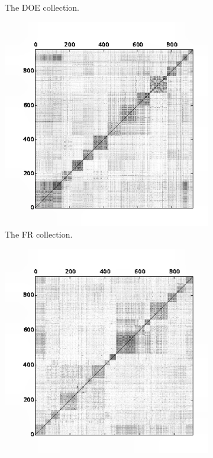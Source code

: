 \documentclass[preprint,12pt,authoryear,review]{elsarticle}
\begin{document}
\begin{figure}[!htbp]
\begin{subfigure}[b]{0.33\textwidth}
        \caption{The DOE collection.}
        \label{fig:doe_sim}
    \end{subfigure}
    \begin{subfigure}[b]{0.33\textwidth}
        \includegraphics[width=\textwidth]{FR-simcos}
        \caption{The FR collection.}
        \label{fig:fr_sim}
    \end{subfigure}
    \begin{subfigure}[b]{0.33\textwidth}
        \includegraphics[width=\textwidth]{SJMN-simcos}

\end{subfigure}
\end{figure}
\end{document}
